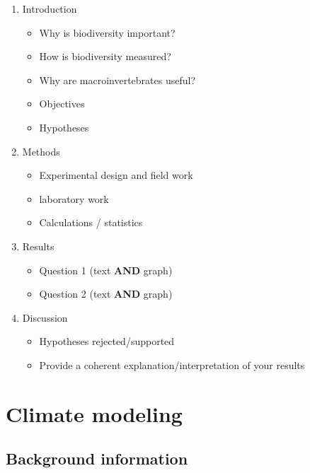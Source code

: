 \documentclass[]{book}
\providecommand{\tightlist}{%
  \setlength{\itemsep}{0pt}\setlength{\parskip}{0pt}}
\begin{document}
\begin{enumerate}
\def\labelenumi{\arabic{enumi}.}
\tightlist
\item
  Introduction

  \begin{itemize}
  \tightlist
  \item
    Why is biodiversity important?
  \item
    How is biodiversity measured?
  \item
    Why are macroinvertebrates useful?
  \item
    Objectives
  \item
    Hypotheses
  \end{itemize}
\item
  Methods

  \begin{itemize}
  \tightlist
  \item
    Experimental design and field work
  \item
    laboratory work
  \item
    Calculations / statistics
  \end{itemize}
\item
  Results

  \begin{itemize}
  \tightlist
  \item
    Question 1 (text \textbf{AND} graph)
  \item
    Question 2 (text \textbf{AND} graph)
  \end{itemize}
\item
  Discussion

  \begin{itemize}
  \tightlist
  \item
    Hypotheses rejected/supported
  \item
    Provide a coherent explanation/interpretation of your results
  \end{itemize}
\end{enumerate}

\hypertarget{climate-modeling}{%
\chapter{Climate modeling}\label{climate-modeling}}

\hypertarget{background-information-5}{%
\section{Background information}\label{background-information-5}}
\end{document}

